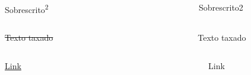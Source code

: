 \documentclass[
]{book}
\begin{document}
\begin{columns}

\begin{column}

Sobrescrito\textsuperscript{2}

\end{column}

\begin{column}

~

\end{column}

\begin{column}

Sobrescrito2

\end{column}

\end{columns}

\begin{columns}

\begin{column}

\sout{Texto taxado}

\end{column}

\begin{column}

~

\end{column}

\begin{column}

Texto taxado

\end{column}

\end{columns}

\begin{columns}

\begin{column}

\href{des.uem.br}{Link}

\end{column}

\begin{column}

~

\end{column}

\begin{column}

Link

\end{column}

\end{columns}
\end{document}
